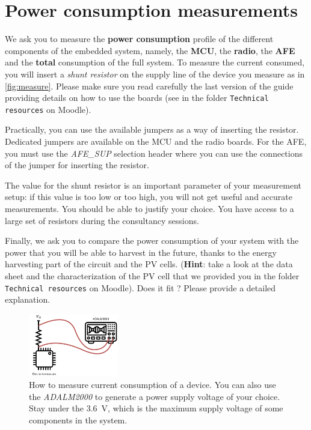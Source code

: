 \newpage
\section{Power consumption measurements}
We ask you to measure the \textbf{power consumption} profile of the different
components of the embedded system, namely, the \textbf{MCU}, the \textbf{radio},
the \textbf{AFE} and the \textbf{total} consumption of the full system.
To measure the current consumed, you will insert
a \emph{shunt resistor} on the supply line of the device you
measure as in \autoref{fig:measure}. Please make sure you read carefully the last version
of the guide providing details on how to use the boards (see in the folder \texttt{Technical resources} on Moodle).

Practically, you can use the available jumpers as a way of inserting the
resistor. Dedicated jumpers are available on the MCU and the radio boards.
For the AFE, you must use the \textit{AFE\_SUP} selection header where you can
use the connections of the jumper for inserting the resistor.

The value for the shunt resistor is an important parameter of your measurement
setup: if this value is too low or too high, you will not get useful and
accurate measurements. You should be able to justify your choice.
You have access to a large set of resistors during the consultancy sessions.

Finally, we ask you to compare the power consumption of your system with the power that you will be able to harvest
in the future, thanks to the energy harvesting part of the circuit and the PV cells. (\textbf{Hint}: take a look at the data sheet and the characterization of the PV cell that we provided you in the folder \texttt{Technical resources} on Moodle). Does it fit ? Please provide a detailed explanation.

 \begin{figure}[h]
     \centering
     \includegraphics[width=0.35\textwidth]{figs/measure.pdf}
     \caption{%
         How to measure current consumption of a device. You can also use the
         \textit{ADALM2000} to generate a power supply voltage of your choice.
         Stay under the \SI{3.6}{V}, which is the maximum supply voltage of some
         components in the system.
     }
     \label{fig:measure}
 \end{figure}

